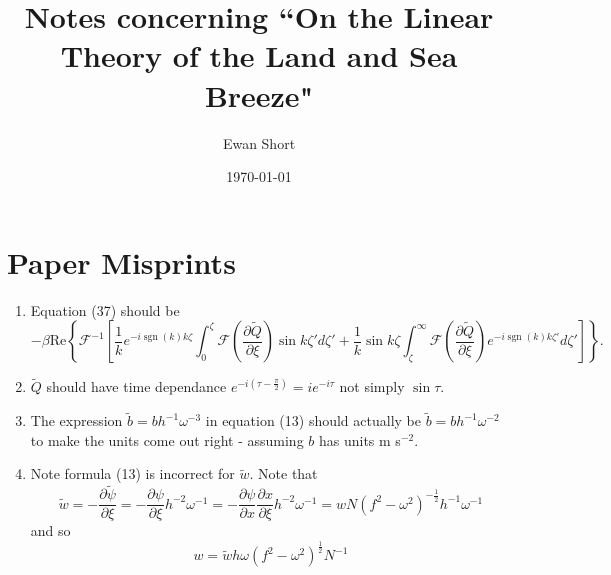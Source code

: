 \documentclass[12pt]{article}
\title{Notes concerning ``On the Linear Theory of the Land and Sea Breeze"  \citep{rotunno83}}
\author{Ewan Short}
\date{\today}
\DeclareMathOperator{\sgn}{sgn}
\begin{document}
\maketitle

\section{Paper Misprints}
\begin{enumerate}
\item
Equation (37) should be 
\begin{equation*}
 -\beta \textrm{Re}\left\{ \mathcal{F}^{-1}\left[ \frac{1}{k}e^{-i\sgn(k) k \zeta} \int_0^\zeta \mathcal{F}\left(\frac{\partial \tilde{Q}}{\partial \xi}\right) \sin k\zeta' d\zeta' + \frac{1}{k}\sin k \zeta \int_\zeta^\infty \mathcal{F}\left(\frac{\partial \tilde{Q}}{\partial \xi}\right) e^{-i\sgn(k)k\zeta'} d\zeta' \right] \right\}.
\end{equation*}
\item
$\tilde{Q}$ should have time dependance $e^{-i\left(\tau-\frac{\pi}{2}\right)}=ie^{-i\tau}$ not simply $\sin\tau$. 
\item
The expression $\tilde{b} = b h^{-1} \omega^{-3}$ in equation (13) should actually be $\tilde{b} = b h^{-1} \omega^{-2}$ to make the units come out right - assuming $b$ has units m s$^{-2}$.
\item
Note formula (13) is incorrect for $\tilde{w}$. Note that 
\begin{equation}
\tilde{w}=-\frac{\partial \tilde{\psi}}{\partial \xi}=-\frac{\partial \psi}{\partial \xi}h^{-2}\omega^{-1}=-\frac{\partial \psi}{\partial x}\frac{\partial x}{\partial \xi}h^{-2}\omega^{-1} =w N (f^2-\omega^2)^{-\frac{1}{2}} h^{-1}\omega^{-1} 
\end{equation}
and so 
\begin{equation}
w=\tilde{w}h\omega(f^2-\omega^2)^\frac{1}{2}N^{-1}
\end{equation}
\end{enumerate}
\end{document}
